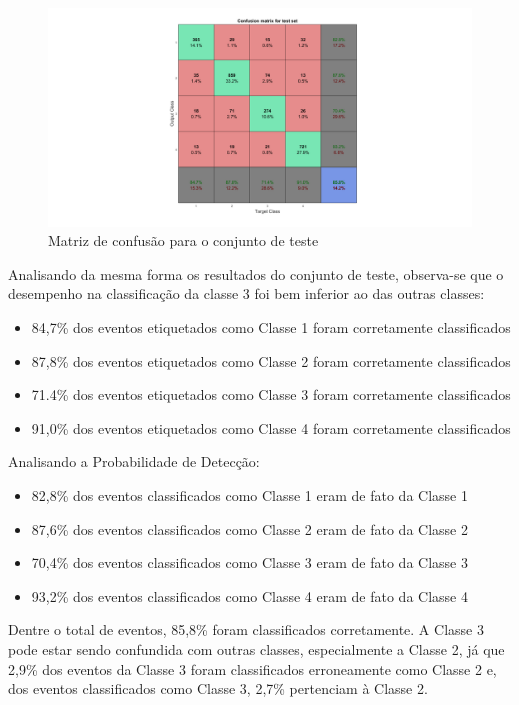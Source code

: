 \documentclass[]{report}
\begin{document}
	\begin{figure}[H]
		\vspace{-4cm}
		\hspace{-5cm}\includegraphics[width=1.8\linewidth]{picts/confusion_test.png}
		\vspace{-1.2cm}\caption{Matriz de confusão para o conjunto de teste}
	\end{figure}
	Analisando da mesma forma os resultados do conjunto de teste, observa-se que o desempenho na classificação da classe 3 foi bem inferior ao das outras classes:
	\begin{itemize}
		\item 84,7\% dos eventos etiquetados como Classe 1 foram corretamente classificados
		\item 87,8\% dos eventos etiquetados como Classe 2 foram corretamente classificados
		\item 71.4\% dos eventos etiquetados como Classe 3 foram corretamente classificados
		\item 91,0\% dos eventos etiquetados como Classe 4 foram corretamente classificados
	\end{itemize}
	Analisando a Probabilidade de Detecção:
	\begin{itemize}
		\item 82,8\% dos eventos classificados como Classe 1 eram de fato da Classe 1
		\item 87,6\% dos eventos classificados como Classe 2 eram de fato da Classe 2
		\item 70,4\% dos eventos classificados como Classe 3 eram de fato da Classe 3
		\item 93,2\% dos eventos classificados como Classe 4 eram de fato da Classe 4
	\end{itemize}
	\vspace{0.5cm}
	Dentre o total de eventos, 85,8\% foram classificados corretamente. A Classe 3 pode estar sendo confundida com outras classes, especialmente a Classe 2, já que 2,9\% dos eventos da Classe 3 foram classificados erroneamente como Classe 2 e, dos eventos classificados como Classe 3, 2,7\% pertenciam à Classe 2.
	
\end{document}
